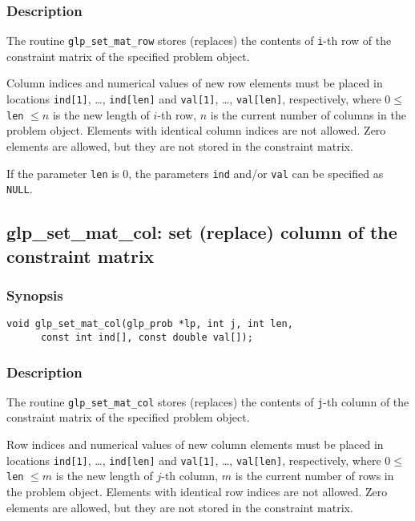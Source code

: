 \subsubsection*{Description}

The routine \verb|glp_set_mat_row| stores (replaces) the contents of
\verb|i|-th row of the constraint matrix of the specified problem
object.

Column indices and numerical values of new row elements must be placed
in locations \verb|ind[1]|, \dots, \verb|ind[len]| and \verb|val[1]|,
\dots, \verb|val[len]|, respectively, where $0 \leq$ \verb|len| $\leq n$
is the new length of $i$-th row, $n$ is the current number of columns in
the problem object. Elements with identical column indices are not
allowed. Zero elements are allowed, but they are not stored in the
constraint matrix.

If the parameter \verb|len| is 0, the parameters \verb|ind| and/or
\verb|val| can be specified as \verb|NULL|.

\subsection{glp\_set\_mat\_col: set (replace) column of the
constr\-aint matrix}

\subsubsection*{Synopsis}

\begin{verbatim}
void glp_set_mat_col(glp_prob *lp, int j, int len,
      const int ind[], const double val[]);
\end{verbatim}

\subsubsection*{Description}

The routine \verb|glp_set_mat_col| stores (replaces) the contents of
\verb|j|-th column of the constraint matrix of the specified problem
object.

Row indices and numerical values of new column elements must be placed
in locations \verb|ind[1]|, \dots, \verb|ind[len]| and \verb|val[1]|,
\dots, \verb|val[len]|, respectively, where $0 \leq$ \verb|len| $\leq m$
is the new length of $j$-th column, $m$ is the current number of rows in
the problem object. Elements with identical row indices are not allowed.
Zero elements are allowed, but they are not stored in the constraint
matrix.

